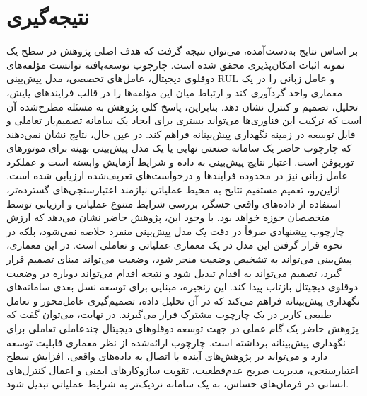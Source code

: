 \section{نتیجه‌گیری}
\label{sec}
بر اساس نتایج به‌دست‌آمده، می‌توان نتیجه گرفت که هدف اصلی پژوهش در سطح یک نمونه اثبات امکان‌پذیری محقق شده است. چارچوب توسعه‌یافته توانست مؤلفه‌های دوقلوی دیجیتال، عامل‌های تخصصی، مدل پیش‌بینی \gls{RUL} و عامل زبانی را در یک معماری واحد گردآوری کند و ارتباط میان این مؤلفه‌ها را در قالب فرایندهای پایش، تحلیل، تصمیم و کنترل نشان دهد. بنابراین، پاسخ کلی پژوهش به مسئله مطرح‌شده آن است که ترکیب این فناوری‌ها می‌تواند بستری برای ایجاد یک سامانه تصمیم‌یار تعاملی و قابل توسعه در زمینه نگهداری پیش‌بینانه فراهم کند.
در عین حال، نتایج نشان نمی‌دهند که چارچوب حاضر یک سامانه صنعتی نهایی یا یک مدل پیش‌بینی بهینه برای موتورهای توربوفن است. اعتبار نتایج پیش‌بینی به داده و شرایط آزمایش وابسته است و عملکرد عامل زبانی نیز در محدوده فرایندها و درخواست‌های تعریف‌شده ارزیابی شده است. ازاین‌رو، تعمیم مستقیم نتایج به محیط عملیاتی نیازمند اعتبارسنجی‌های گسترده‌تر، استفاده از داده‌های واقعی حسگر، بررسی شرایط متنوع عملیاتی و ارزیابی توسط متخصصان حوزه خواهد بود.
با وجود این، پژوهش حاضر نشان می‌دهد که ارزش چارچوب پیشنهادی صرفاً در دقت یک مدل پیش‌بینی منفرد خلاصه نمی‌شود، بلکه در نحوه قرار گرفتن این مدل در یک معماری عملیاتی و تعاملی است. در این معماری، پیش‌بینی می‌تواند به تشخیص وضعیت منجر شود، وضعیت می‌تواند مبنای تصمیم قرار گیرد، تصمیم می‌تواند به اقدام تبدیل شود و نتیجه اقدام می‌تواند دوباره در وضعیت دوقلوی دیجیتال بازتاب پیدا کند. این زنجیره، مبنایی برای توسعه نسل بعدی سامانه‌های نگهداری پیش‌بینانه فراهم می‌کند که در آن تحلیل داده، تصمیم‌گیری عامل‌محور و تعامل طبیعی کاربر در یک چارچوب مشترک قرار می‌گیرند.
در نهایت، می‌توان گفت که پژوهش حاضر یک گام عملی در جهت توسعه دوقلوهای دیجیتال چندعاملی تعاملی برای نگهداری پیش‌بینانه برداشته است. چارچوب ارائه‌شده از نظر معماری قابلیت توسعه دارد و می‌تواند در پژوهش‌های آینده با اتصال به داده‌های واقعی، افزایش سطح اعتبارسنجی، مدیریت صریح عدم‌قطعیت، تقویت سازوکارهای ایمنی و اعمال کنترل‌های انسانی در فرمان‌های حساس، به یک سامانه نزدیک‌تر به شرایط عملیاتی تبدیل شود.

